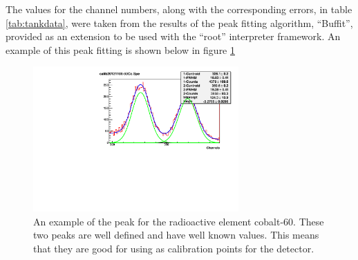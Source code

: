 The values for the channel numbers, along with the corresponding errors, in table \ref{tab:tankdata}, were taken from the results of the peak fitting algorithm, ``Buffit'', provided as an extension to be used with the ``root'' interpreter framework. An example of this peak fitting is shown below in figure \ref{fig:tankspecbuffit}
\begin{figure}[ht]
	\centering
	\includegraphics[width=0.7\textwidth]{calib20121113-60Co.pdf}
	\caption{An example of the peak for the radioactive element cobalt-60. These two peaks are well defined and have well known values. This means that they are good for using as calibration points for the detector.\label{fig:tankspecbuffit}}
\end{figure}



